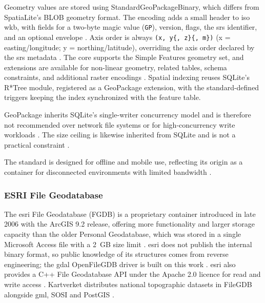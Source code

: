 Geometry values are stored using StandardGeoPackageBinary, which differs from SpatiaLite's BLOB geometry format. The encoding adds a small header to \acrshort{iso} \acrshort{wkb}, with fields for a two-byte magic value (\texttt{GP}), version, flags, the \acrshort{srs} identifier, and an optional envelope \parencite{ogc2024_geopackage_encoding_standard_140}. Axis order is always \texttt{(x, y\{, z\}\{, m\})} (x = easting/longitude; y = northing/latitude), overriding the axis order declared by the \acrshort{srs} metadata \parencite{ogc2024_geopackage_encoding_standard_140}. The core supports the Simple Features geometry set, and extensions are available for non-linear geometry, related tables, schema constraints, and additional raster encodings \parencite{ogc2024_geopackage_encoding_standard_140}. Spatial indexing reuses SQLite's R*Tree module, registered as a GeoPackage extension, with the standard-defined triggers keeping the index synchronized with the feature table.

GeoPackage inherits SQLite's single-writer concurrency model and is therefore not recommended over network file systems or for high-concurrency write workloads \parencite{sqlite2024_appropriate_uses}. The size ceiling is likewise inherited from SQLite and is not a practical constraint \parencite{ogc2024_geopackage_encoding_standard_140}.

The standard is designed for offline and mobile use, reflecting its origin as a container for disconnected environments with limited bandwidth \parencite{ogc2024_geopackage_encoding_standard_140}.

\subsubsection{ESRI File Geodatabase}
The \acrfull{esri} File Geodatabase (FGDB) is a proprietary container introduced in late 2006 with the ArcGIS 9.2 release, offering more functionality and larger storage capacity than the older Personal Geodatabase, which was stored in a single Microsoft Access file with a 2~GB size limit \parencite{esri2024_its_not_personal}. \acrshort{esri} does not publish the internal binary format, so public knowledge of its structures comes from reverse engineering; the \acrshort{gdal} OpenFileGDB driver is built on this work \parencite{rouault2013_filegdb_format_specification, gdal2025_openfilegdb_driver}. \acrshort{esri} also provides a C++ File Geodatabase API under the Apache 2.0 licence for read and write access \parencite{esri2024_file_geodatabase_api}. Kartverket distributes national topographic datasets in FileGDB alongside \acrshort{gml}, SOSI and PostGIS \parencite{kartverket2026_geonorge_kartkatalogen}.

